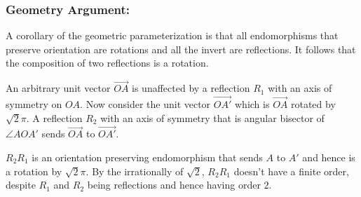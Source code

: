 \subsubsection{Geometry Argument:}
A corollary of the geometric parameterization is that all endomorphisms that preserve orientation are rotations and all the invert are reflections.
It follows that the composition of two reflections is a rotation.

An arbitrary unit vector $\vec{OA}$ is unaffected by a reflection $R_1$ with an axis of symmetry on $OA$.
Now consider the unit vector $\vec{OA'}$ which is $\vec{OA}$ rotated by $\sqrt{2}\pi$.
A reflection $R_2$ with an axis of symmetry that is angular bisector of $\angle AOA'$ sends $\vec{OA}$ to $\vec{OA'}$.

$R_2R_1$ is an orientation preserving endomorphism that sends $A$ to $A'$ and hence is a rotation by $\sqrt{2}\pi$.
By the irrationally of $\sqrt{2}$,
$R_2R_1$ doesn't have a finite order, despite $R_1$ and $R_2$ being reflections and hence having order $2$.
\begin{center}
\end{center}
